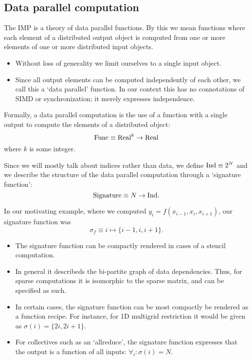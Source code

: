 
\subsection{Data parallel computation}

The \acf{IMP} is a theory of data parallel functions. By this we mean
functions where each element of a distributed output object is computed from
one or more elements of one or more distributed input
objects.
\begin{itemize}
\item Without loss of generality we limit ourselves to a single
  input object.
\item Since all output elements can be computed independently of each
  other, we call this a `data parallel' function. In our context this
  has no connotations of SIMD or synchronization; it merely expresses
  independence.
\end{itemize}
Formally, a data parallel computation is the use of a 
function with a single output to compute the elements of a distributed object:
\[ \mathord{\mathrm{Func}} \equiv  \mathord{\mathrm{Real}}^k\rightarrow \mathord{\mathrm{Real}} \]
where $k$ is some integer.

Since we will mostly talk about indices rather than data, we define
%
$\mathord{\mathrm{Ind}} \equiv 2^N$
%
and we describe the structure of the data parallel computation
through a `signature function':
%
\[ \mathord{\mathrm{Signature}}\equiv N\rightarrow \mathord{\mathrm{Ind}}. \]
%

In our motivating example, where we computed
$y_i=f(x_{i-1},x_i,x_{i+1})$, our signature function was
\[ \sigma_f\equiv i\mapsto \{ i-1,i,i+1 \}. \]

\begin{itemize}
\item The signature function can be compactly rendered in cases of a
  stencil computation.
\item In general it describeds the bi-partite graph of data
  dependencies. Thus, for sparse computations it is isomorphic to the
  sparse matrix, and can be specified as such.
\item In certain cases, the signature function can be most compactly
  be rendered as a function recipe. For instance, for 1D multigrid
  restriction it would be given as $\sigma(i)=\{2i,2i+1\}$.
\item For collectives such as an `allreduce', the signature function
  expresses that the output is a function of all inputs:
  $\forall_i\colon\sigma(i)=N$.
\end{itemize}

